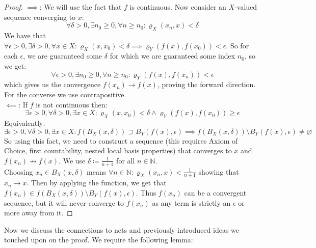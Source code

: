\documentclass{exam}
\begin{document}
\begin{proof}
  $\implies$: We will use the fact that $f$ is continuous. Now consider an $X$-valued sequence converging to $x$:
  \begin{equation*}
    \forall \delta > 0, \exists n_0 \geqslant 0, \forall n \geqslant n_0: \varrho_X(x_n, x) < \delta
  \end{equation*}
  We have that $\forall \epsilon > 0, \exists \delta > 0, \forall x \in X: \varrho_X(x, x_0) < \delta \implies \varrho_Y(f(x), f(x_0)) < \epsilon$. So for each $\epsilon$, we are guaranteed some $\delta$ for which we are guaranteed some index $n_0$, so we get:
  \begin{equation*}
    \forall \epsilon > 0, \exists n_0 \geqslant 0, \forall n \geqslant n_0: \varrho_Y(f(x), f(x_n)) < \epsilon
  \end{equation*}
  which gives us the convergence $f(x_n) \xrightarrow{} f(x)$, proving the forward direction. For the converse we use contrapositive.\\

  $\impliedby$: If $f$ is not continuous then:
  \begin{equation*}
    \exists \epsilon > 0, \forall \delta > 0, \exists x \in X: \varrho_X(x, x_0) < \delta \land \varrho_Y(f(x), f(x_0)) \geqslant \epsilon
  \end{equation*}
  Equivalently:
  \begin{equation*}
    \exists \epsilon > 0, \forall \delta > 0, \exists x \in X: f(B_X(x, \delta)) \supset B_Y(f(x), \epsilon) \implies f(B_X(x, \delta)) \setminus B_Y(f(x), \epsilon) \neq \varnothing
  \end{equation*}
  So using this fact, we need to construct a sequence (this requires Axiom of Choice, first countability, nested local basis properties) that converges to $x$ and $f(x_n) \nrightarrow f(x)$. We use $\delta \coloneq \frac{1}{n+1}$ for all $n \in \mathbb{N}$.\\
  
  Choosing $x_n \in B_X(x, \delta)$ means $\forall n \in \mathbb{N}: \varrho_X(x_n, x) < \frac{1}{n+1}$ showing that $x_n \xrightarrow{} x$. Then by applying the function, we get that $f(x_n) \in f(B_X(x, \delta)) \setminus B_Y(f(x), \epsilon)$. Thus $f(x_n)$ can be a convergent sequence, but it will never converge to $f(x_n)$ as any term is strictly an $\epsilon$ or more away from it.
\end{proof}
Now we discuss the connections to nets and previously introduced ideas we touched upon on the proof. We require the following lemma:
\end{document}
